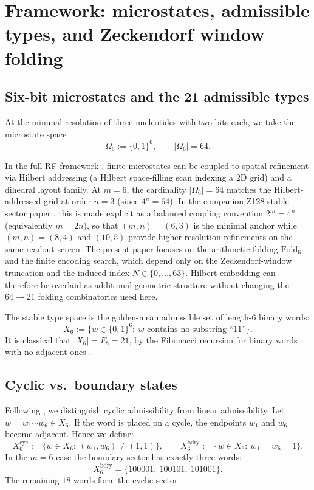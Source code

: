 \section{Framework: microstates, admissible types, and Zeckendorf window folding}
\label{sec:framework}

\subsection{Six-bit microstates and the 21 admissible types}
\label{sec:microstates}

At the minimal resolution of three nucleotides with two bits each, we take the microstate space
\[
\Omega_6:=\{0,1\}^6,\qquad |\Omega_6|=64.
\]

\begin{remark}
\label{rem:hilbert_context}
In the full RF framework \cite{Ma2025RF}, finite microstates can be coupled to spatial refinement via Hilbert addressing (a Hilbert space-filling scan indexing a $2$D grid) \cite{Hilbert1891,Sagan1994} and a dihedral layout family.
At $m=6$, the cardinality $|\Omega_6|=64$ matches the Hilbert-addressed grid at order $n=3$ (since $4^n=64$).
In the companion Z128 stable-sector paper \cite{Ma2025Z128SM}, this is made explicit as a balanced coupling convention $2^m=4^n$ (equivalently $m=2n$), so that $(m,n)=(6,3)$ is the minimal anchor while $(m,n)=(8,4)$ and $(10,5)$ provide higher-resolution refinements on the same readout screen.
The present paper focuses on the arithmetic folding $\mathrm{Fold}_6$ and the finite encoding search, which depend only on the Zeckendorf-window truncation and the induced index $N\in\{0,\dots,63\}$.
Hilbert embedding can therefore be overlaid as additional geometric structure without changing the $64\to 21$ folding combinatorics used here.
\end{remark}

The stable type space is the golden-mean admissible set of length-$6$ binary words:
\[
X_6:=\{w\in\{0,1\}^6:\ \text{$w$ contains no substring ``11''}\}.
\]
It is classical that $|X_6|=F_8=21$, by the Fibonacci recursion for binary words with no adjacent ones \cite{LindMarcus1995,Koshy2001}.

\subsection{Cyclic vs.\ boundary states}
\label{sec:boundary}

Following \cite{Ma2025RF}, we distinguish cyclic admissibility from linear admissibility.
Let $w=w_1\cdots w_6\in X_6$.
If the word is placed on a cycle, the endpoints $w_1$ and $w_6$ become adjacent.
Hence we define:
\[
X_6^{\mathrm{cyc}}:=\{w\in X_6:\ (w_1,w_6)\neq (1,1)\},\qquad
X_6^{\mathrm{bdry}}:=\{w\in X_6:\ w_1=w_6=1\}.
\]
In the $m=6$ case the boundary sector has exactly three words:
\[
X_6^{\mathrm{bdry}}=\{100001,\ 100101,\ 101001\}.
\]
The remaining $18$ words form the cyclic sector.


